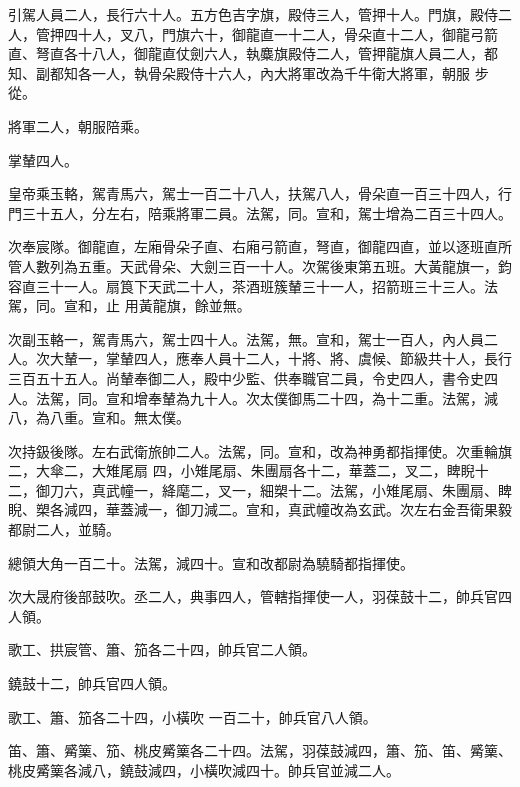 \begin{pinyinscope}
 引駕人員二人，長行六十人。五方色吉字旗，殿侍三人，管押十人。門旗，殿侍二人，管押四十人，叉八，門旗六十，御龍直一十二人，骨朵直十二人，御龍弓箭直、弩直各十八人，御龍直仗劍六人，執麋旗殿侍二人，管押龍旗人員二人，都知、副都知各一人，執骨朵殿侍十六人，內大將軍改為千牛衛大將軍，朝服
 步從。



 將軍二人，朝服陪乘。



 掌輦四人。



 皇帝乘玉輅，駕青馬六，駕士一百二十八人，扶駕八人，骨朵直一百三十四人，行門三十五人，分左右，陪乘將軍二員。法駕，同。宣和，駕士增為二百三十四人。



 次奉宸隊。御龍直，左廂骨朵子直、右廂弓箭直，弩直，御龍四直，並以逐班直所管人數列為五重。天武骨朵、大劍三百一十人。次駕後東第五班。大黃龍旗一，鈞容直三十一人。扇筤下天武二十人，茶酒班簇輦三十一人，招箭班三十三人。法駕，同。宣和，止
 用黃龍旗，餘並無。



 次副玉輅一，駕青馬六，駕士四十人。法駕，無。宣和，駕士一百人，內人員二人。次大輦一，掌輦四人，應奉人員十二人，十將、將、虞候、節級共十人，長行三百五十五人。尚輦奉御二人，殿中少監、供奉職官二員，令史四人，書令史四人。法駕，同。宣和增奉輦為九十人。次太僕御馬二十四，為十二重。法駕，減八，為八重。宣和。無太僕。



 次持鈒後隊。左右武衛旅帥二人。法駕，同。宣和，改為神勇都指揮使。次重輪旗二，大傘二，大雉尾扇
 四，小雉尾扇、朱團扇各十二，華蓋二，叉二，睥睨十二，御刀六，真武幢一，絳麾二，叉一，細槊十二。法駕，小雉尾扇、朱團扇、睥睨、槊各減四，華蓋減一，御刀減二。宣和，真武幢改為玄武。次左右金吾衛果毅都尉二人，並騎。



 總領大角一百二十。法駕，減四十。宣和改都尉為驍騎都指揮使。



 次大晟府後部鼓吹。丞二人，典事四人，管轄指揮使一人，羽葆鼓十二，帥兵官四人領。



 歌工、拱宸管、簫、笳各二十四，帥兵官二人領。



 鐃鼓十二，帥兵官四人領。



 歌工、簫、笳各二十四，小橫吹
 一百二十，帥兵官八人領。



 笛、簫、觱篥、笳、桃皮觱篥各二十四。法駕，羽葆鼓減四，簫、笳、笛、觱篥、桃皮觱篥各減八，鐃鼓減四，小橫吹減四十。帥兵官並減二人。




\end{pinyinscope}
